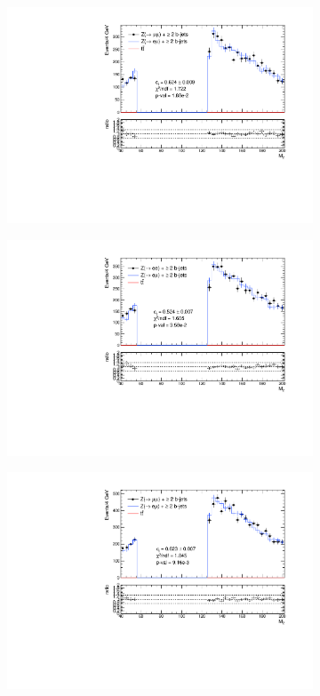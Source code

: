 \documentclass{article}
\begin{document}
\begin{figure}
\begin{center}
\begin{subfigure}[b]{0.45\textwidth}
	\end{subfigure}
	\begin{subfigure}[b]{0.45\textwidth}
		\includegraphics[width=\linewidth]{Zmm_ZMass_2017.pdf}
	\end{subfigure}
	\begin{subfigure}[b]{0.45\textwidth}
		\includegraphics[width=\linewidth]{Zee_ZMass_2018.pdf}
	\end{subfigure}
	\begin{subfigure}[b]{0.45\textwidth}
		\includegraphics[width=\linewidth]{Zmm_ZMass_2018.pdf}

\end{subfigure}
\end{center}
\end{figure}
\end{document}

